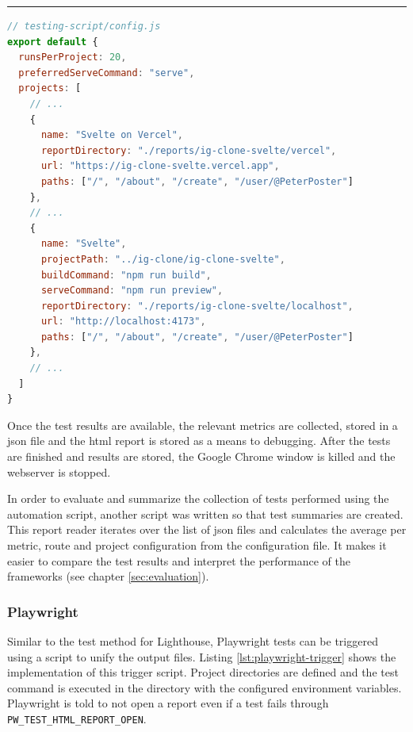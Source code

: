 \documentclass[a4paper, 12pt]{article}
\begin{document}
\hrule
\pagebreak
\begin{lstlisting}[caption={Test configuration for Lighthouse tests}, language=JavaScript, label={lst:lighthouse-config}]
// testing-script/config.js
export default {
  runsPerProject: 20,
  preferredServeCommand: "serve",
  projects: [
    // ...
    {
      name: "Svelte on Vercel",
      reportDirectory: "./reports/ig-clone-svelte/vercel",
      url: "https://ig-clone-svelte.vercel.app",
      paths: ["/", "/about", "/create", "/user/@PeterPoster"]
    },
    // ...
    {
      name: "Svelte",
      projectPath: "../ig-clone/ig-clone-svelte",
      buildCommand: "npm run build",
      serveCommand: "npm run preview",
      reportDirectory: "./reports/ig-clone-svelte/localhost",
      url: "http://localhost:4173",
      paths: ["/", "/about", "/create", "/user/@PeterPoster"]
    },
    // ...
  ]
}
\end{lstlisting}
\vspace{1cm}

Once the test results are available, the relevant metrics are collected, stored in a \acrshort{json} file and the \acrshort{html} report is stored as a means to debugging.
After the tests are finished and results are stored, the Google Chrome window is killed and the webserver is stopped.

In order to evaluate and summarize the collection of tests performed using the automation script, another script was written so that test summaries are created.
This report reader iterates over the list of \acrshort{json} files and calculates the average per metric, route and project configuration from the configuration file.
It makes it easier to compare the test results and interpret the performance of the frameworks (see chapter \ref{sec:evaluation}).

\subsubsection{Playwright}

Similar to the test method for Lighthouse, Playwright tests can be triggered using a script to unify the output files.
Listing \ref{lst:playwright-trigger} shows the implementation of this trigger script.
Project directories are defined and the test command is executed in the directory with the configured environment variables.
Playwright is told to not open a report even if a test fails through \verb|PW_TEST_HTML_REPORT_OPEN|.
\end{document}
